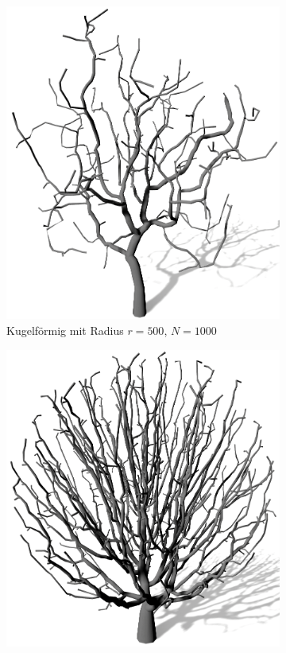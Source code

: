 \begin{figure} [hbtp]
	\centering
	\begin{subfigure}[t]{.45\textwidth}
		\centering
		\includegraphics[height=.25\textheight]{images/SCA_Einfluss_Sphere_Low.png}
		\caption{Kugelförmig mit Radius $r = 500$, $N = 1000$}
		\label{subfig:SCA_Einfluss_Sphere_Low}
	\end{subfigure}
	\hspace{.05\linewidth}
	\begin{subfigure}[t]{.45\textwidth}
		\centering
		\includegraphics[height=.25\textheight]{images/SCA_Einfluss_Sphere_High.png}

\end{subfigure}
\end{figure}
